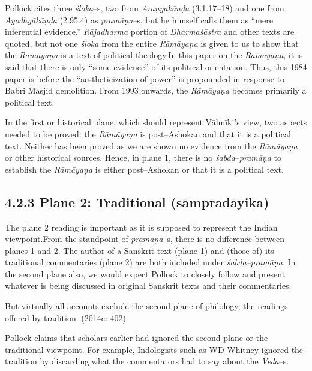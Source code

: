Pollock cites three \textit{śloka}–s, two from \textit{Araṇyakāṇḍa} (3.1.17–18) and one from \textit{Ayodhyākāṇḍa} (2.95.4) as \textit{pramāṇa}–s, but he himself calls them as “mere inferential evidence.” \textit{Rājadharma} portion of \textit{Dharmaśāstra} and other texts are quoted, but not one \textit{śloka} from the entire \textit{Rāmāyaṇa} is given to us to show that the \textit{Rāmāyaṇa} is a text of political theology.In this paper on the \textit{Rāmāyaṇa}, it is said that there is only “some evidence” of its political orientation. Thus, this 1984 paper is before the “aestheticization of power” is propounded in response to Babri Masjid demolition. From 1993 onwards, the \textit{Rāmāyaṇa} becomes primarily a political text.

In the first or historical plane, which should represent Vālmīki’s view, two aspects needed to be proved: the \textit{Rāmāyaṇa} is post–Ashokan and that it is a political text. Neither has been proved as we are shown no evidence from the \textit{Rāmāyaṇa} or other historical sources. Hence, in plane 1, there is no \textit{śabda}–\textit{pramāṇa} to establish the \textit{Rāmāyaṇa} is either post–Ashokan or that it is a political text.

\vspace{-.2cm}

\subsection*{4.2.3 Plane 2: Traditional (sāmpradāyika)}

The plane 2 reading is important as it is supposed to represent the Indian viewpoint.From the standpoint of \textit{pramāṇa}–s, there is no difference between planes 1 and 2. The author of a Sanskrit text (plane 1) and (those of) its traditional commentaries (plane 2) are both included under \textit{śabda–pramāṇa}. In the second plane also, we would expect Pollock to closely follow and present whatever is being discussed in original Sanskrit texts and their commentaries.

\begin{myquote}
But virtually all accounts exclude the second plane of philology, the readings offered by tradition. (2014c: 402)
\end{myquote}

Pollock claims that scholars earlier had ignored the second plane or the traditional viewpoint. For example, Indologists such as WD Whitney ignored the tradition by discarding what the commentators had to say about the \textit{Veda}–s.

